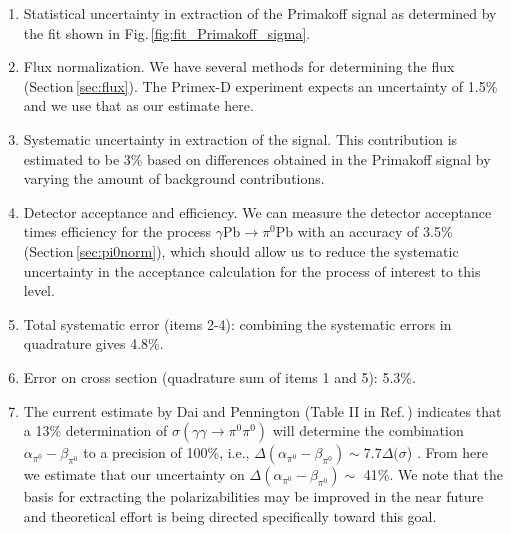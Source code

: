\begin{enumerate}

\item
Statistical uncertainty in extraction of the Primakoff signal as determined by the fit shown in Fig.\,\ref{fig:fit_Primakoff_sigma}.

\item
Flux normalization. We have several methods for determining the flux (Section\,\ref{sec:flux}). The Primex-D experiment expects an uncertainty of 1.5\% and we use that as our estimate here.

\item
Systematic uncertainty in extraction of the signal. This contribution is estimated to be 3\% based on differences obtained in the Primakoff signal by varying the amount of background contributions.

\item
Detector acceptance and efficiency. We can measure the detector acceptance times efficiency for the process $\gamma \mathrm{Pb} \rightarrow \pi^0 \mathrm{Pb}$ with an accuracy of 3.5\% (Section\,\ref{sec:pi0norm}), which
should allow us to reduce the systematic uncertainty in the acceptance calculation for the process of interest to this level.

\item
Total systematic error (items 2-4): combining the systematic errors in quadrature gives 4.8\%.

\item 
Error on cross section (quadrature sum of items 1 and 5): 5.3\%.

\item
The current estimate by Dai and Pennington (Table II in Ref.\,\cite{Dai:2016ytz}) indicates
that a 13\% determination of
$\sigma(\gamma\gamma\rightarrow\pi^0\pi^0)$ will determine the
combination $\alpha_{\pi^0}-\beta_{\pi^0}$ to a precision of 100\%, i.e., $\Delta(\alpha_{\pi^0}-\beta_{\pi^0}) \sim 7.7\Delta(\sigma$) .
From here we estimate that our uncertainty on $\Delta(\alpha_{\pi^0}-\beta_{\pi^0}) \sim$ 41\%. We note that the basis for extracting the polarizabilities may be improved
in the near future and theoretical effort is being directed specifically toward this goal.

\end{enumerate}

